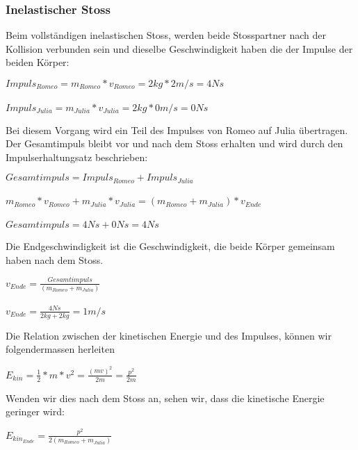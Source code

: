 \documentclass[../main.tex]{subfiles}
\begin{document}
\subsubsection{Inelastischer Stoss}
Beim vollständigen inelastischen Stoss, werden beide Stosspartner nach der Kollision verbunden sein und dieselbe
Geschwindigkeit haben %
die der Impulse der beiden Körper:
\begin{mdframed}
$Impuls_{Romeo} = m_{Romeo}*v_{Romeo} = 2kg * 2m/s = 4 Ns$\\\\
$Impuls_{Julia} = m_{Julia}*v_{Julia} = 2kg * 0m/s = 0Ns$
\end{mdframed}
 Bei diesem Vorgang wird ein Teil des Impulses von Romeo auf Julia übertragen. Der Gesamtimpuls bleibt vor
 und nach dem Stoss erhalten und wird durch den Impulserhaltungsatz beschrieben:%
\begin{mdframed}
$Gesamtimpuls = Impuls_{Romeo} + Impuls_{Julia}$
\\\\$m_{Romeo}*v_{Romeo} +  m_{Julia}*v_{Julia} = (m_{Romeo} + m_{Julia})*v_{Ende}$\\\\
$Gesamtimpuls = 4Ns + 0Ns = 4Ns$
\end{mdframed}
Die Endgeschwindigkeit ist die Geschwindigkeit, die beide Körper gemeinsam haben nach dem Stoss.
\begin{mdframed}
$v_{Ende} = \frac{Gesamtimpuls}{(m_{Romeo} + m_{Julia})}$\\\\
$v_{Ende} = \frac{4Ns}{2kg + 2kg} = 1m/s$
\end{mdframed}

Die Relation zwischen der kinetischen Energie und des Impulses, können wir folgendermassen
herleiten %
\begin{mdframed}
$E_{kin}=\frac{1}{2} * m * v^{2} = \frac{(mv)^{2}}{2m} = \frac{p^{2}}{2m}$
\end{mdframed}
Wenden wir dies nach dem Stoss an, sehen wir, dass die kinetische Energie geringer wird:
\begin{mdframed}
$E_{kin_{Ende}}=\frac{p^{2}}{2(m_{Romeo} + m_{Julia})} $
\end{mdframed}
\end{document}
